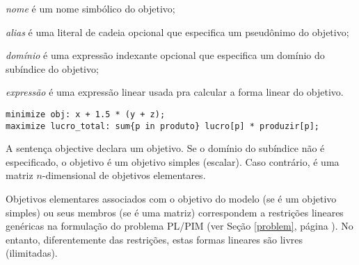\documentclass[11pt, brazil]{report}
\def\para#1{\noindent{\bf#1}}
\begin{document}
\medskip

\noindent
{\it nome} é um nome simbólico do objetivo;

\noindent
{\it alias} é uma literal de cadeia opcional que especifica um
pseudônimo do objetivo;

\noindent
{\it domínio} é uma expressão indexante opcional que especifica
um domínio do subíndice do objetivo;

\noindent
{\it expressão} é uma expressão linear usada pra calcular a forma
linear do objetivo.


%
%
%
%
%
%
%

\newpage

\para{Exemplos}


\begin{verbatim}
minimize obj: x + 1.5 * (y + z);
maximize lucro_total: sum{p in produto} lucro[p] * produzir[p];
\end{verbatim}


A sentença objective declara um objetivo. Se o domínio do subíndice
não é especificado, o objetivo é um objetivo simples (escalar). Caso contrário,
é uma matriz $n$-dimensional de objetivos elementares.

Objetivos elementares associados com o objetivo do modelo (se é um
objetivo simples) ou seus membros (se é uma matriz) correspondem
a restrições lineares genéricas na formulação do problema PL/PIM
(ver Seção \ref{problem}, página \pageref{problem}). No entanto,
diferentemente das restrições, estas formas lineares são livres
(ilimitadas).
\end{document}
